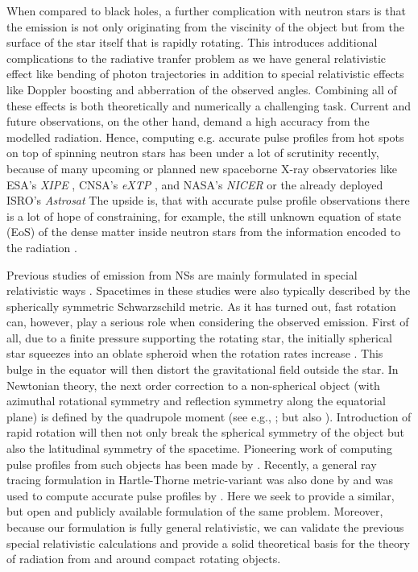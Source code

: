 \documentclass[iop, usenatbib]{emulateapj}
\newcommand{\sch}{Schwarzschild }
\begin{document}
When compared to black holes, a further complication with neutron stars is that the emission is not only originating from the viscinity of the object but from the surface of the star itself that is rapidly rotating.
This introduces additional complications to the radiative tranfer problem as we have general relativistic effect like bending of photon trajectories in addition to special relativistic effects like Doppler boosting and abberration of the observed angles.
Combining all of these effects is both theoretically and numerically a challenging task.
Current and future observations, on the other hand, demand a high accuracy from the modelled radiation.
Hence, computing e.g. accurate pulse profiles from hot spots on top of spinning neutron stars has been under a lot of scrutinity recently, because of many upcoming or planned new spaceborne X-ray observatories like ESA's \textit{XIPE} \citep{XIPE}, CNSA's \textit{eXTP} \citep{eXTP}, and NASA's \textit{NICER} \citep{NICER} or the already deployed ISRO's \textit{Astrosat} \citep{Astrosat}
The upside is, that with accurate pulse profile observations there is a lot of hope of constraining, for example, the still unknown equation of state (EoS) of the dense matter inside neutron stars from the information encoded to the radiation \citep[see e.g.,][]{LMB13}.

Previous studies of emission from NSs are mainly formulated in special relativistic ways \citep[see e.g.,][]{PFC83, P95, WM01, PB06}. %
Spacetimes in these studies were also typically described by the spherically symmetric \sch metric.
As it has turned out, fast rotation can, however, play a serious role when considering the observed emission.
First of all, due to a finite pressure supporting the rotating star, the initially spherical star squeezes into an oblate spheroid when the rotation rates increase \citep[see e.g.,][]{CST94, MLC07, aGM14}.
This bulge in the equator will then distort the gravitational field outside the star.
In Newtonian theory, the next order correction to a non-spherical object (with azimuthal rotational symmetry and reflection symmetry along the equatorial plane) is defined by the quadrupole moment (see e.g., \citealt{LP99}; but also \citealt{PA12}).
Introduction of rapid rotation will then not only break the spherical symmetry of the object but also the latitudinal symmetry of the spacetime.
Pioneering work of computing pulse profiles from such objects has been made by \citealt{CL05, CML07}.
Recently, a general ray tracing formulation in Hartle-Thorne metric-variant was also done by \citealt{PJ12, BPO12} and was used to compute accurate pulse profiles by \citealt{PO14}.
Here we seek to provide a similar, but open and publicly available formulation of the same problem.
Moreover, because our formulation is fully general relativistic, we can validate the previous special relativistic calculations and provide a solid theoretical basis for the theory of radiation from and around compact rotating objects.
\end{document}
